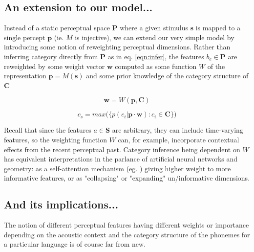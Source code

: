 
\subsection{An extension to our model...}

Instead of a static perceptual space $\mathbf{P}$ where a given stimulus $\mathbf{s}$ is mapped to a single percept $\mathbf{p}$ (ie. $M$ is injective), we can extend our very simple model by introducing some notion of reweighting perceptual dimensions. Rather than inferring category directly from $\mathbf{P}$ as in eq. \ref{eqn:infer}, the features $b_e \in \mathbf{P}$ are reweighted by some weight vector $\mathbf{w}$ computed as some function $W$ of the representation $\mathbf{p} = M(\mathbf{s})$ and some prior knowledge of the category structure of $\mathbf{C}$

\begin{equation}
\label{eqn:w}
\mathbf{w} = W(\mathbf{p}, \mathbf{C})
\end{equation}

\begin{equation}
\label{eqn:infer_2}
c_s = max\big( \big\{ p(c_i | \mathbf{p} \cdot \mathbf{w}) : c_i \in \mathbf{C} \big\}\big)
\end{equation}

Recall that since the features $a \in \mathbf{S}$ are arbitrary, they can include time-varying features, so the weighting function $W$ can, for example, incorporate contextual effects from the recent perceptual past. Category inference being dependent on $W$ has equivalent interpretations in the parlance of artificial neural networks and geometry: as a self-attention mechanism (eg. \citep{vaswaniAttentionAllYou2017}) giving higher weight to more informative features, or as "collapsing" or "expanding" un/informative dimensions. 

\subsection{And its implications...}

The notion of different perceptual features having different weights or importance depending on the acoustic context and the category structure of the phonemes for a particular language is of course far from new. 

